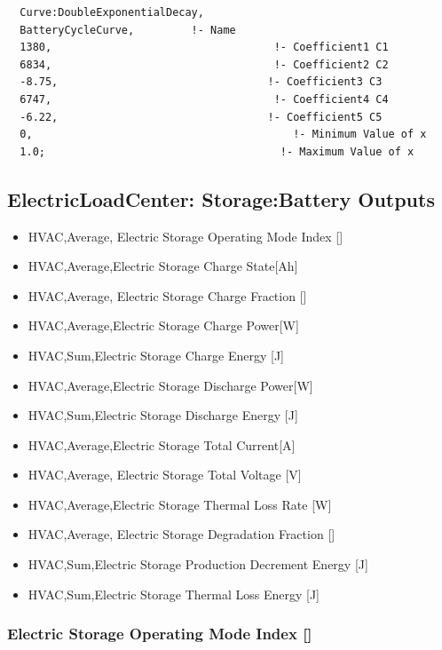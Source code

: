 \begin{lstlisting}
  Curve:DoubleExponentialDecay,
  BatteryCycleCurve,         !- Name
  1380,                                   !- Coefficient1 C1
  6834,                                   !- Coefficient2 C2
  -8.75,                                 !- Coefficient3 C3
  6747,                                   !- Coefficient4 C4
  -6.22,                                 !- Coefficient5 C5
  0,                                         !- Minimum Value of x
  1.0;                                     !- Maximum Value of x
\end{lstlisting}

\subsection{ElectricLoadCenter: Storage:Battery Outputs}\label{electricloadcenter-storagebattery-outputs}

\begin{itemize}
\item
  HVAC,Average, Electric Storage Operating Mode Index {[]}
\item
  HVAC,Average,Electric Storage Charge State{[}Ah{]}
\item
  HVAC,Average, Electric Storage Charge Fraction {[]}
\item
  HVAC,Average,Electric Storage Charge Power{[}W{]}
\item
  HVAC,Sum,Electric Storage Charge Energy {[}J{]}
\item
  HVAC,Average,Electric Storage Discharge Power{[}W{]}
\item
  HVAC,Sum,Electric Storage Discharge Energy {[}J{]}
\item
  HVAC,Average,Electric Storage Total Current{[}A{]}
\item
  HVAC,Average, Electric Storage Total Voltage {[}V{]}
\item
  HVAC,Average,Electric Storage Thermal Loss Rate {[}W{]}
\item
  HVAC,Average, Electric Storage Degradation Fraction {[]}
\item
  HVAC,Sum,Electric Storage Production Decrement Energy {[}J{]}
\item
  HVAC,Sum,Electric Storage Thermal Loss Energy {[}J{]}
\end{itemize}

\subsubsection{Electric Storage Operating Mode Index {[]}}\label{electric-storage-operating-mode-index}

